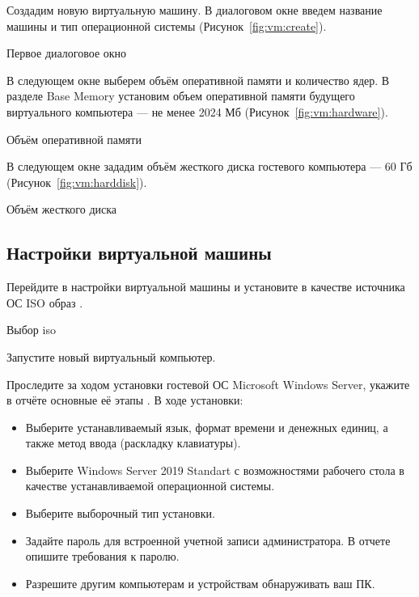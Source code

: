 Создадим новую виртуальную машину.
В диалоговом окне введем название машины и тип операционной системы
(Рисунок~\ref{fig:vm:create}).

\begin{image}
	\caption{Первое диалоговое окно}
	\label{fig:vm:create}
\end{image}

В следующем окне выберем объём оперативной памяти и количество ядер.
В разделе Base Memory установим объем оперативной памяти будущего
виртуального компьютера --- не менее 2024 Мб (Рисунок~\ref{fig:vm:hardware}).

\begin{image}
	\caption{Объём оперативной памяти}
	\label{fig:vm:hardware}
\end{image}

В следующем окне зададим объём жесткого диска гостевого компьютера --- 60 Гб
(Рисунок~\ref{fig:vm:harddisk}).

\begin{image}
	\caption{Объём жесткого диска}
	\label{fig:vm:harddisk}
\end{image}

\subsection{Настройки виртуальной машины}

Перейдите в настройки виртуальной машины и установите
в качестве источника ОС ISO образ .

\begin{image}
	\caption{Выбор iso}
	\label{fig:vm:iso}
\end{image}

Запустите новый виртуальный компьютер.\par
Проследите за ходом установки гостевой ОС Microsoft Windows Server,
укажите в отчёте основные её этапы .
В ходе установки:

\begin{itemize}
	\item Выберите устанавливаемый язык, формат времени и денежных единиц,
		а также метод ввода (раскладку клавиатуры).
	\item Выберите Windows Server 2019 Standart с возможностями рабочего стола
		в качестве устанавливаемой операционной системы.
	\item Выберите выборочный тип установки.
	\item Задайте пароль для встроенной учетной записи администратора.
		В отчете опишите требования к паролю.
	\item Разрешите другим компьютерам и устройствам обнаруживать ваш ПК.
\end{itemize}

